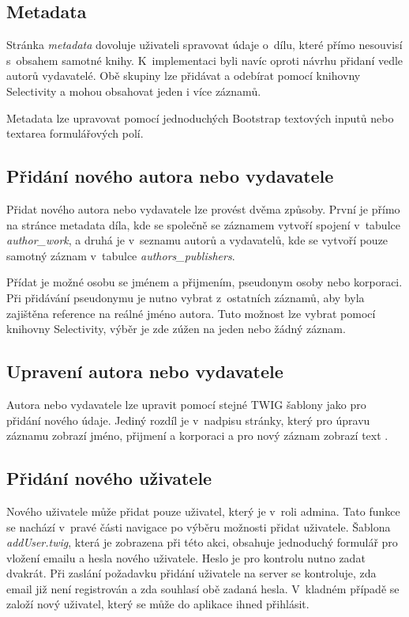         \subsection{Metadata}
            Stránka \textit{metadata} dovoluje uživateli spravovat údaje o~dílu, které přímo nesouvisí s~obsahem samotné knihy. K~implementaci byli navíc oproti návrhu přidaní vedle autorů vydavatelé. Obě skupiny lze přidávat a odebírat pomocí knihovny Selectivity a mohou obsahovat jeden i více záznamů.
            
            Metadata lze upravovat pomocí jednoduchých Bootstrap textových inputů nebo textarea formulářových polí.
            
        \subsection{Přidání nového autora nebo vydavatele}
            Přidat nového autora nebo vydavatele lze provést dvěma způsoby. První je přímo na stránce metadata díla, kde se společně se záznamem vytvoří spojení v~tabulce \textit{author\_work}, a druhá je v~seznamu autorů a vydavatelů, kde se vytvoří pouze samotný záznam v~tabulce \textit{authors\_publishers}.
            
            Přídat je možné osobu se jménem a přijmením, pseudonym osoby nebo korporaci. Při přidávání pseudonymu je nutno vybrat z~ostatních záznamů, aby byla zajištěna reference na reálné jméno autora. Tuto možnost lze vybrat pomocí knihovny Selectivity, výběr je zde zúžen na jeden nebo žádný záznam.
        
        \subsection{Upravení autora nebo vydavatele}
            Autora nebo vydavatele lze upravit pomocí stejné TWIG šablony jako pro přidání nového údaje. Jediný rozdíl je v~nadpisu stránky, který pro úpravu záznamu zobrazí jméno, přijmení a korporaci a pro nový záznam zobrazí text .

        \subsection{Přidání nového uživatele}
            Nového uživatele může přidat pouze uživatel, který je v~roli admina. Tato funkce se nachází v~pravé části navigace po výběru možnosti přidat uživatele. Šablona \textit{addUser.twig}, která je zobrazena při této akci, obsahuje jednoduchý formulář pro vložení emailu a hesla nového uživatele. Heslo je pro kontrolu nutno zadat dvakrát. Při zaslání požadavku přidání uživatele na server se kontroluje, zda email již není registrován a zda souhlasí obě zadaná hesla. V~kladném případě se založí nový uživatel, který se může do aplikace ihned přihlásit.
        

